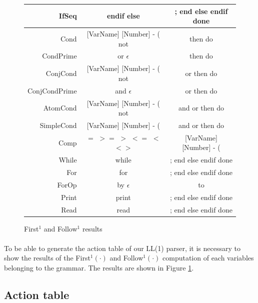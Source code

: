 \documentclass[letterpaper]{article}
\begin{document}
{\begin{figure}[H]
\begin{tabular}{| r || c | c |}
        \hline
        IfSeq & endif else & ; end else endif done \\
        \hline
        Cond & [VarName] [Number] - ( not & then do \\
        \hline
        CondPrime & or $\epsilon$ & then do \\
        \hline
        ConjCond & [VarName] [Number] - ( not &
        or then do  \\
        \hline
        ConjCondPrime & and $\epsilon$ & or then do\\
        \hline
        AtomCond & [VarName] [Number] - ( not &
        and or then do \\
        \hline
        SimpleCond & [VarName] [Number] - ( &
        and or then do \\
        \hline
        Comp & $=$ $>=$ $>$ $<=$ $<$ $<>$ &
        [VarName] [Number] - ( \\
        \hline
        While & while & ; end else endif done \\
        \hline
        For & for & ; end else endif done \\
        \hline
        ForOp & by $\epsilon$ & to \\
        \hline
        Print & print & ; end else endif done \\
        \hline
        Read & read & ; end else endif done \\
        \hline
    \end{tabular}
    \caption{First$^1$ and Follow$^1$ results}
    \label{fig:firstfollow}
\end{figure}
\clearpage
\restoregeometry
}

\paragraph{}

To be able to generate the action table of our LL(1) parser, it is necessary
to show the results of the First$^1(\cdot)$ and Follow$^1(\cdot)$
computation of each variables
belonging to the grammar. The results are shown in Figure \ref{fig:firstfollow}.

\subsection{Action table}

\label{explainactiontable}

\paragraph{}
\end{document}
